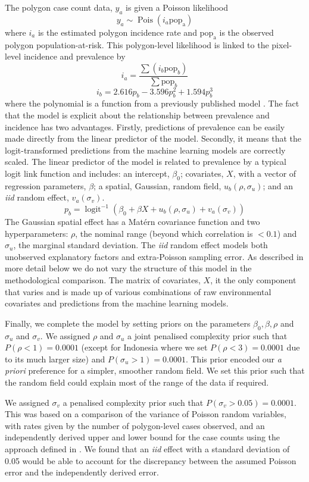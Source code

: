 \documentclass[review]{elsarticle}
\begin{document}
The polygon case count data, $y_a$ is given a Poisson likelihood
$$y_a \sim \operatorname{Pois}(i_a\mathrm{pop_a})$$
where $i_a$ is the estimated polygon incidence rate and $\mathrm{pop_a}$ is the observed polygon population-at-risk. 
This polygon-level likelihood is linked to the pixel-level incidence and prevalence by
$$i_a = \frac{ \sum(i_b \mathrm{pop}_b)}{\sum  \mathrm{pop}_b} $$
$$i_b = 2.616p_b - 3.596p_b^2 + 1.594p_b^3$$
where the polynomial is  a function from a previously published model \citep{cameron2015defining}.
The fact that the model is explicit about the relationship between prevalence and incidence has two advantages.
Firstly, predictions of prevalence can be easily made directly from the linear predictor of the model.
Secondly, it means that the logit-transformed predictions from the machine learning models are correctly scaled.
The linear predictor of the model is related to prevalence by a typical logit link function and includes: an intercept, $\beta_0$; covariates, $X$, with a vector of regression parameters, $\beta$; a spatial, Gaussian, random field, $u_b(\rho, \sigma_u)$; and an \emph{iid} random effect, $v_a(\sigma_v)$.
$$p_b = \operatorname{logit}^{-1}\left(\beta_0 + \beta X  + u_b\left(\rho, \sigma_u\right) + v_a\left(\sigma_v\right)\right)$$
The Gaussian spatial effect has a Mat\'ern covariance function and two hyperparameters: $\rho$, the nominal range (beyond which correlation is $< 0.1$) and $\sigma_u$, the marginal standard deviation.
The \emph{iid} random effect models both unobserved explanatory factors and extra-Poisson sampling error.
As described in more detail below we do not vary the structure of this model in the methodological comparison.
The matrix of covariates, $X$, it the only component that varies and is made up of various combinations of raw environmental covariates and predictions from the machine learning models.

Finally, we complete the model by setting priors on the parameters $\beta_0, \beta, \rho$ and $\sigma_u$ and $\sigma_v$. 
We assigned $\rho$ and $\sigma_u$ a joint penalised complexity prior \citep{fuglstad2018constructing} such that $P(\rho < 1) = 0.0001$ (except for Indonesia where we set $P(\rho < 3) = 0.0001$ due to its much larger size) and $P(\sigma_u > 1) = 0.0001$. 
This prior encoded our \emph{a priori} preference for a simpler, smoother random field.
We set this prior such that the random field could explain most of the range of the data if required.

We assigned $\sigma_v$ a penalised complexity prior \citep{simpson2017penalising} such that $P(\sigma_v > 0.05) =  0.0001$. 
This was based on a comparison of the variance of Poisson random variables, with rates given by the number of polygon-level cases observed, and an independently derived upper and lower bound for the case counts using the approach defined in \citep{cibulskis2011worldwide}. 
We found that an \emph{iid} effect with a standard deviation of 0.05 would be able to account for the discrepancy between the assumed Poisson error and the independently derived error.
\end{document}
